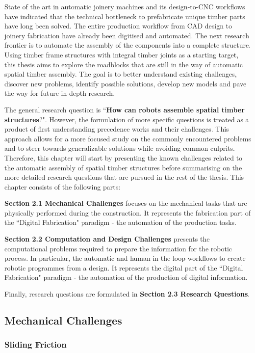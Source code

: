 \documentclass[11pt]{book}
\begin{document}
State of the art in automatic joinery machines and its design-to-CNC workflows have indicated that the technical bottleneck to prefabricate unique timber parts have long been solved. The entire production workflow from CAD design to joinery fabrication have already been digitised and automated. The next research frontier is to automate the assembly of the components into a complete structure. Using timber frame structures with integral timber joints as a starting target, this thesis aims to explore the roadblocks that are still in the way of automatic spatial timber assembly. The goal is to better understand existing challenges, discover new problems, identify possible solutions, develop new models and pave the way for future in-depth research.

The general research question is ``\textbf{How can robots assemble spatial timber structures}?". However, the formulation of more specific questions is treated as a product of first understanding precedence works and their challenges. This approach allows for a more focused study on the commonly encountered problems and to steer towards generalizable solutions while avoiding common culprits. Therefore, this chapter will start by presenting the known challenges related to the automatic assembly of spatial timber structures before summarising on the more detailed research questions that are pursued in the rest of the thesis. This chapter consists of the following parts: 

\textbf{Section 2.1 Mechanical Challenges }focuses on the mechanical tasks that are physically performed during the construction. It represents the fabrication part of the ``Digital Fabrication" paradigm - the automation of the production tasks.

\textbf{Section 2.2 Computation and Design Challenges} presents the computational problems required to prepare the information for the robotic process. In particular, the automatic and human-in-the-loop workflows to create robotic programmes from a design. It represents the digital part of the ``Digital Fabrication" paradigm - the automation of the production of digital information.

Finally, research questions are formulated in \textbf{Section 2.3 Research Questions}. 

\subsection{Mechanical Challenges}

\subsubsection{Sliding Friction}
\end{document}
